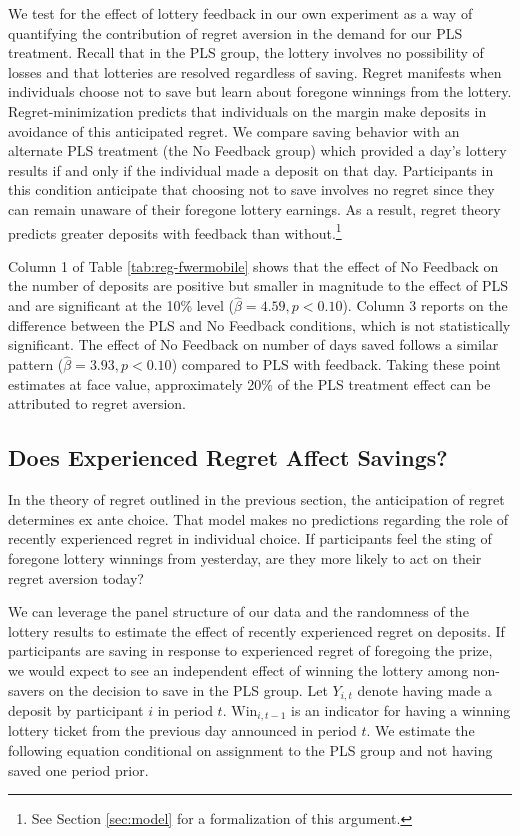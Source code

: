 \documentclass[12pt]{article}
\begin{document}
		We test for the effect of lottery feedback in our own experiment as a way of quantifying the contribution of regret aversion in the demand for our PLS treatment. Recall that in the PLS group, the lottery involves no possibility of losses and that lotteries are resolved regardless of saving. Regret manifests when individuals choose not to save but learn about foregone winnings from the lottery. Regret-minimization predicts that individuals on the margin make deposits in avoidance of this anticipated regret. We compare saving behavior with an alternate PLS treatment (the No Feedback group) which provided a day's lottery results if and only if the individual made a deposit on that day. Participants in this condition anticipate that choosing not to save involves no regret since they can remain unaware of their foregone lottery earnings. As a result, regret theory predicts greater deposits with feedback than without.\footnote{See Section \ref{sec:model} for a formalization of this argument.}

		Column 1 of Table \ref{tab:reg-fwermobile} shows that the effect of No Feedback on the number of deposits are positive but smaller in magnitude to the effect of PLS and are significant at the 10\% level ($\hat \beta = 4.59, p < 0.10$). Column 3 reports on the difference between the PLS and No Feedback conditions, which is not statistically significant. The effect of No Feedback on number of days saved follows a similar pattern ($\hat \beta = 3.93, p < 0.10$) compared to PLS with feedback. Taking these point estimates at face value, approximately 20\% of the PLS treatment effect can be attributed to regret aversion.

	\subsection{Does Experienced Regret Affect Savings?}

		In the theory of regret outlined in the previous section, the anticipation of regret determines ex ante choice. That model makes no predictions regarding the role of recently experienced regret in individual choice. If participants feel the sting of foregone lottery winnings from yesterday, are they more likely to act on their regret aversion today?

		We can leverage the panel structure of our data and the randomness of the lottery results to estimate the effect of recently experienced regret on deposits. If participants are saving in response to experienced regret of foregoing the prize, we would expect to see an independent effect of winning the lottery among non-savers on the decision to save in the PLS group. Let $Y_{i,t}$ denote having made a deposit by participant $i$ in period $t$. $\text{Win}_{i,t-1}$ is an indicator for having a winning lottery ticket from the previous day announced in period $t$. We estimate the following equation conditional on assignment to the PLS group and not having saved one period prior.
\end{document}
